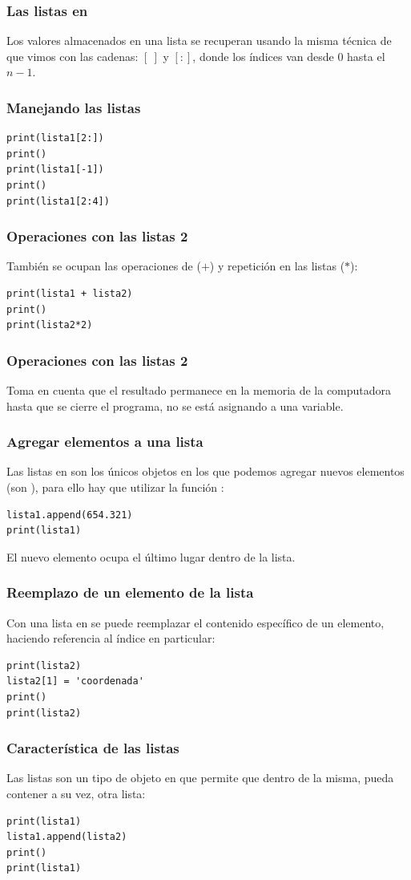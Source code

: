 \documentclass[12pt]{beamer}
\begin{document}
\begin{frame}
\frametitle{Las listas en \python}
Los valores almacenados en una lista se recuperan usando la misma técnica de  que vimos con las cadenas: \pause $[ \: ]$ y $[:]$, \pause donde los índices van desde  $0$ hasta el   $n - 1$.
\end{frame}
\begin{frame}[fragile]
\frametitle{Manejando las listas}
\begin{lstlisting}[caption=Usando el slicing en una lista]
print(lista1[2:])
print()
print(lista1[-1])
print()
print(lista1[2:4])
\end{lstlisting}
\end{frame}
\begin{frame}[fragile]
\frametitle{Operaciones con las listas 2}
También se ocupan las operaciones de  ($+$) \pause y repetición en las listas ($*$):
\pause
\begin{lstlisting}[caption=Concatenación y repetición de listas]
print(lista1 + lista2)
print()
print(lista2*2)
\end{lstlisting}
\end{frame}
\begin{frame}
\frametitle{Operaciones con las listas 2}
Toma en cuenta que el resultado permanece en la memoria de la computadora hasta que se cierre el programa, no se está asignando a una variable.
\end{frame}
\begin{frame}[fragile]
\frametitle{Agregar elementos a una lista}
Las listas en \python{} son los únicos objetos en los que podemos agregar nuevos elementos (son ), para ello hay que utilizar la función :
\pause
\begin{lstlisting}[caption=Agregando un elemento a la lista]
lista1.append(654.321)
print(lista1)
\end{lstlisting}
\pause
El nuevo elemento ocupa el último lugar dentro de la lista.
\end{frame}
\begin{frame}[fragile]
\frametitle{Reemplazo de un elemento de la lista}
Con una lista en \python{} se puede reemplazar el contenido específico de un elemento, haciendo referencia al índice en particular:
\pause
\begin{lstlisting}[caption=Modificando el contenido de un elemento de la lista]
print(lista2)
lista2[1] = 'coordenada'
print()
print(lista2)
\end{lstlisting}
\end{frame}
\begin{frame}[fragile]
\frametitle{Característica de las listas}
Las listas son un tipo de objeto en \python{} que permite que dentro de la misma, pueda contener a su vez, otra lista:
\pause
\begin{lstlisting}[caption=Una lista dentro de una lista]
print(lista1)
lista1.append(lista2)
print()
print(lista1)
\end{lstlisting}
\end{frame}
\end{document}
